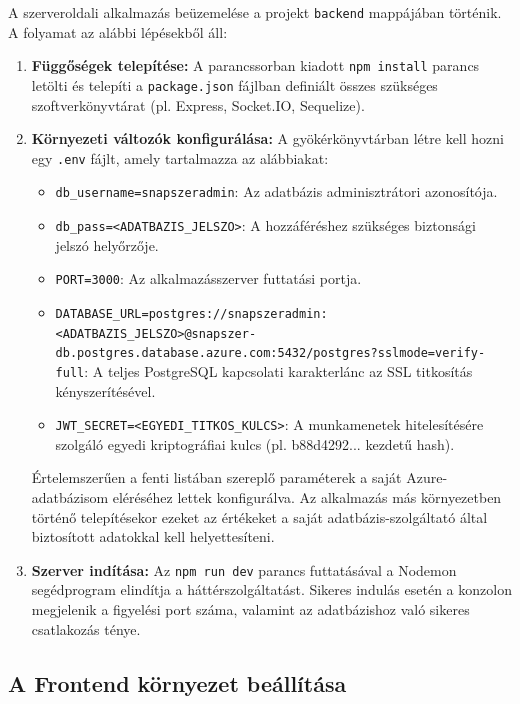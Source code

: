 A szerveroldali alkalmazás beüzemelése a projekt \texttt{backend} mappájában történik. A folyamat az alábbi lépésekből áll:
\begin{enumerate}
    \item \textbf{Függőségek telepítése:} A parancssorban kiadott \texttt{npm install} parancs letölti és telepíti a \texttt{package.json} fájlban definiált összes szükséges szoftverkönyvtárat (pl. Express, Socket.IO, Sequelize).
    \item \textbf{Környezeti változók konfigurálása:} A gyökérkönyvtárban létre kell hozni egy \texttt{.env} fájlt, amely tartalmazza az alábbiakat:
    \begin{itemize}
        \item \texttt{db\_username=snapszeradmin}: Az adatbázis adminisztrátori azonosítója.
        \item \texttt{db\_pass=<ADATBAZIS\_JELSZO>}: A hozzáféréshez szükséges biztonsági jelszó helyőrzője.
        \item \texttt{PORT=3000}: Az alkalmazásszerver futtatási portja.
        \item \texttt{DATABASE\_URL=postgres://snapszeradmin:}\allowbreak\texttt{<ADATBAZIS\_JELSZO>@snapszer-db.postgres.}\allowbreak\texttt{database.azure.com:5432/postgres?}\allowbreak\texttt{sslmode=verify-full}: A teljes PostgreSQL kapcsolati karakterlánc az SSL titkosítás kényszerítésével.
        \item \texttt{JWT\_SECRET=<EGYEDI\_TITKOS\_KULCS>}: A munkamenetek hitelesítésére szolgáló egyedi kriptográfiai kulcs (pl. b88d4292... kezdetű hash).
    \end{itemize}

    Értelemszerűen a fenti listában szereplő paraméterek a saját Azure-adatbázisom eléréséhez lettek konfigurálva. Az alkalmazás más környezetben történő telepítésekor ezeket az értékeket a saját adatbázis-szolgáltató által biztosított adatokkal kell helyettesíteni.

    \item \textbf{Szerver indítása:} Az \texttt{npm run dev} parancs futtatásával a Nodemon segédprogram elindítja a háttérszolgáltatást. Sikeres indulás esetén a konzolon megjelenik a figyelési port száma, valamint az adatbázishoz való sikeres csatlakozás ténye.
\end{enumerate}

\subsection{A Frontend környezet beállítása}
\label{subsec:frontend_setup}

